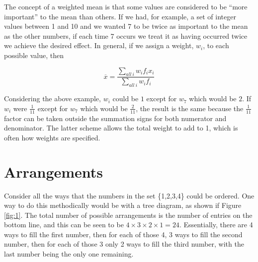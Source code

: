 \documentclass[a5paper]{article}
\begin{document}
The concept of a weighted mean is that some values are considered to be ``more
important'' to the mean than others. If we had, for example, a set of integer
values between 1 and 10 and we wanted 7 to be twice as important to the mean as
the other numbers, if each time 7 occurs we treat it as having occurred twice we
achieve the desired effect. In general, if we assign a weight, $w_i$, to each
possible value, then

\begin{equation}
  \overline{x} = \frac{\sum\limits_{all\ i} w_i f_i x_i}{\sum\limits_{all\ i}
    w_i f_i}
\end{equation}

Considering the above example, $w_i$ could be $1$ except for $w_7$ which would
be $2$. If $w_i$ were $\frac{1}{11}$ except for $w_7$ which would be
$\frac{2}{11}$, the result is the same because the $\frac{1}{11}$ factor can be
taken outside the summation signs for both numerator and denominator. The latter
scheme allows the total weight to add to 1, which is often how weights are
specified.

\section{Arrangements}

Consider all the ways that the numbers in the set \{1,2,3,4\} could be ordered.
One way to do this methodically would be with a tree diagram, as shown if Figure
\ref{fig:1}. The total number of possible arrangements is the number of entries
on the bottom line, and this can be seen to be $4\times 3\times 2\times 1 = 24$.
Essentially, there are 4 ways to fill the first number, then for each of those
4, 3 ways to fill the second number, then for each of those 3 only 2 ways to
fill the third number, with the last number being the only one remaining.
\end{document}
